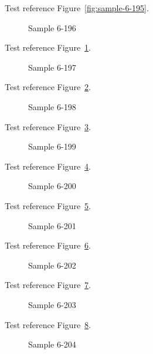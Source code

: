 Test reference Figure~\ref{fig:sample-6-195}.

\begin{figure}[tbhp]
\caption{Sample 6-196}
\label{fig:sample-6-196}
\end{figure}

Test reference Figure~\ref{fig:sample-6-196}.

\begin{figure}[tbhp]
\caption{Sample 6-197}
\label{fig:sample-6-197}
\end{figure}

Test reference Figure~\ref{fig:sample-6-197}.

\begin{figure}[tbhp]
\caption{Sample 6-198}
\label{fig:sample-6-198}
\end{figure}

Test reference Figure~\ref{fig:sample-6-198}.

\begin{figure}[tbhp]
\caption{Sample 6-199}
\label{fig:sample-6-199}
\end{figure}

Test reference Figure~\ref{fig:sample-6-199}.

\begin{figure}[tbhp]
\caption{Sample 6-200}
\label{fig:sample-6-200}
\end{figure}

Test reference Figure~\ref{fig:sample-6-200}.

\begin{figure}[tbhp]
\caption{Sample 6-201}
\label{fig:sample-6-201}
\end{figure}

Test reference Figure~\ref{fig:sample-6-201}.

\begin{figure}[tbhp]
\caption{Sample 6-202}
\label{fig:sample-6-202}
\end{figure}

Test reference Figure~\ref{fig:sample-6-202}.

\begin{figure}[tbhp]
\caption{Sample 6-203}
\label{fig:sample-6-203}
\end{figure}

Test reference Figure~\ref{fig:sample-6-203}.

\begin{figure}[tbhp]
\caption{Sample 6-204}
\label{fig:sample-6-204}
\end{figure}

